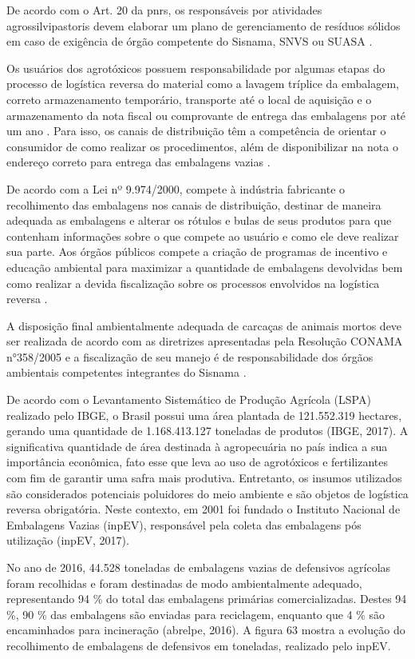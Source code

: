 	De acordo com o Art. 20 da \gls{pnrs}, os responsáveis por atividades agrossilvipastoris devem elaborar um plano de gerenciamento de resíduos sólidos em caso de exigência de órgão competente do Sisnama, SNVS ou SUASA \cite{brasil:12305}.
	
	Os usuários dos agrotóxicos possuem responsabilidade por algumas etapas do processo de logística reversa do material como a lavagem tríplice da embalagem, correto armazenamento temporário, transporte até o local de aquisição e o armazenamento da nota fiscal ou comprovante de entrega das embalagens por até um ano \cite{Brasil9974}. Para isso, os canais de distribuição têm a competência de orientar o consumidor de como realizar os procedimentos, além de disponibilizar na nota o endereço correto para entrega das embalagens vazias \cite{conama:334}.
	
	De acordo com a Lei nº 9.974/2000, compete à indústria fabricante o recolhimento das embalagens nos canais de distribuição, destinar de maneira adequada as embalagens e alterar os rótulos e bulas de seus produtos para que contenham informações sobre o que compete ao usuário e como ele deve realizar sua parte. Aos órgãos públicos compete a criação de programas de incentivo e educação ambiental para maximizar a quantidade de embalagens devolvidas bem como realizar a devida fiscalização sobre os processos envolvidos na logística reversa \cite{Brasil9974}.
	
	A disposição final ambientalmente adequada de carcaças de animais mortos deve ser realizada de acordo com as diretrizes apresentadas pela Resolução CONAMA n°358/2005 e a fiscalização de seu manejo é de responsabilidade dos órgãos ambientais competentes integrantes do Sisnama \cite{brasil:12305}.
	
	De acordo com o Levantamento Sistemático de Produção Agrícola (LSPA) realizado pelo IBGE, o Brasil possui uma área plantada de 121.552.319 hectares, gerando uma quantidade de 1.168.413.127 toneladas de produtos (IBGE, 2017). A significativa quantidade de área destinada à agropecuária no país indica a sua importância econômica, fato esse que leva ao uso de agrotóxicos e fertilizantes com fim de garantir uma safra mais produtiva. Entretanto, os insumos utilizados são considerados potenciais poluidores do meio ambiente e são objetos de logística reversa obrigatória. Neste contexto, em 2001 foi fundado o Instituto Nacional de Embalagens Vazias (inpEV), responsável pela coleta das embalagens pós utilização (inpEV, 2017).
	
	No ano de 2016, 44.528 toneladas de embalagens vazias de defensivos agrícolas foram recolhidas e foram destinadas de modo ambientalmente adequado, representando 94 \% do total das embalagens primárias comercializadas. Destes 94 \%, 90 \% das embalagens são enviadas para reciclagem, enquanto que 4 \% são encaminhados para incineração (\gls{abrelpe}, 2016). A figura 63 mostra a evolução do recolhimento de embalagens de defensivos em toneladas, realizado pelo inpEV.
	
